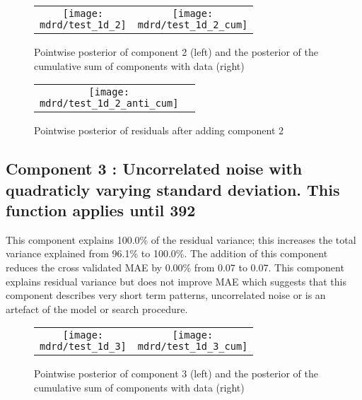 \documentclass{article} %
\begin{document}
\begin{figure}[H]
\newcommand{\wmgd}{0.5\columnwidth}
\newcommand{\hmgd}{3.0cm}
\newcommand{\mdrd}{test_1d}
\newcommand{\mbm}{\hspace{-0.3cm}}
\begin{tabular}{cc}
\mbm \texttt{[image: \\mdrd/test\_1d\_2]} & \texttt{[image: \\mdrd/test\_1d\_2\_cum]}
\end{tabular}
\caption{Pointwise posterior of component 2 (left) and the posterior of the cumulative sum of components with data (right)}
\label{fig:comp2}
\end{figure}

\begin{figure}[H]
\newcommand{\wmgd}{0.5\columnwidth}
\newcommand{\hmgd}{3.0cm}
\newcommand{\mdrd}{test_1d}
\newcommand{\mbm}{\hspace{-0.3cm}}
\begin{tabular}{cc}
\mbm \texttt{[image: \\mdrd/test\_1d\_2\_anti\_cum]}
\end{tabular}
\caption{Pointwise posterior of residuals after adding component 2}
\label{fig:comp2}
\end{figure}

\subsection{Component 3 : Uncorrelated noise with quadraticly varying standard deviation. This function applies until  392}



This component explains 100.0\% of the residual variance; this increases the total variance explained from 96.1\% to 100.0\%.
The addition of this component reduces the cross validated MAE by 0.00\% from 0.07 to 0.07.
This component explains residual variance but does not improve MAE which suggests that this component describes very short term patterns, uncorrelated noise or is an artefact of the model or search procedure.

\begin{figure}[H]
\newcommand{\wmgd}{0.5\columnwidth}
\newcommand{\hmgd}{3.0cm}
\newcommand{\mdrd}{test_1d}
\newcommand{\mbm}{\hspace{-0.3cm}}
\begin{tabular}{cc}
\mbm \texttt{[image: \\mdrd/test\_1d\_3]} & \texttt{[image: \\mdrd/test\_1d\_3\_cum]}
\end{tabular}
\caption{Pointwise posterior of component 3 (left) and the posterior of the cumulative sum of components with data (right)}
\label{fig:comp3}
\end{figure}
\end{document}
